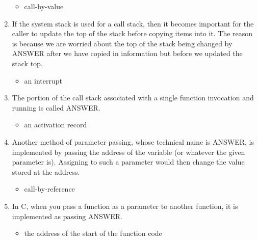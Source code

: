 \documentclass{exam}
\begin{document}
\begin{enumerate}
\begin{itemize}
\item call-by-value
\end{itemize}
\item If the system stack is used for a call stack, then it becomes important for the caller to update the top of the stack before copying items into it.  The reason is because we are worried about the top of the stack being changed by ANSWER after we have copied in information but before we updated the stack top.
\begin{itemize}
\item an interrupt
\end{itemize}
\item The portion of the call stack associated with a single function invocation and running is called ANSWER.
\begin{itemize}
\item an activation record
\end{itemize}
\item Another method of parameter passing, whose technical name is ANSWER, is implemented by passing the address of the variable (or whatever the given parameter is).  Assigning to such a parameter would then change the value stored at the address.
\begin{itemize}
\item call-by-reference
\end{itemize}
\item In C, when you pass a function as a parameter to another function, it is implemented as passing ANSWER.
\begin{itemize}
\item the address of the start of the function code
\end{itemize}
\end{enumerate}
\end{document}

